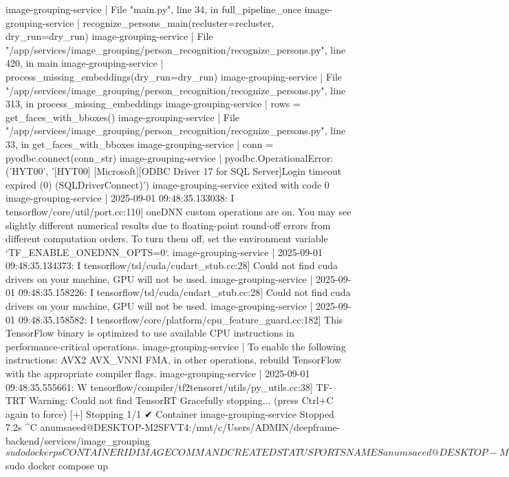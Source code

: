 image-grouping-service  |   File "main.py", line 34, in full_pipeline_once
image-grouping-service  |     recognize_persons_main(recluster=recluster, dry_run=dry_run)
image-grouping-service  |   File "/app/services/image_grouping/person_recognition/recognize_persons.py", line 420, in main
image-grouping-service  |     process_missing_embeddings(dry_run=dry_run)
image-grouping-service  |   File "/app/services/image_grouping/person_recognition/recognize_persons.py", line 313, in process_missing_embeddings
image-grouping-service  |     rows = get_faces_with_bboxes()
image-grouping-service  |   File "/app/services/image_grouping/person_recognition/recognize_persons.py", line 33, in get_faces_with_bboxes
image-grouping-service  |     conn = pyodbc.connect(conn_str)
image-grouping-service  | pyodbc.OperationalError: ('HYT00', '[HYT00] [Microsoft][ODBC Driver 17 for SQL Server]Login timeout expired (0) (SQLDriverConnect)')
image-grouping-service exited with code 0
image-grouping-service  | 2025-09-01 09:48:35.133038: I tensorflow/core/util/port.cc:110] oneDNN custom operations are on. You may see slightly different numerical results due to floating-point round-off errors from different computation orders. To turn them off, set the environment variable `TF_ENABLE_ONEDNN_OPTS=0`.
image-grouping-service  | 2025-09-01 09:48:35.134373: I tensorflow/tsl/cuda/cudart_stub.cc:28] Could not find cuda drivers on your machine, GPU will not be used.
image-grouping-service  | 2025-09-01 09:48:35.158226: I tensorflow/tsl/cuda/cudart_stub.cc:28] Could not find cuda drivers on your machine, GPU will not be used.
image-grouping-service  | 2025-09-01 09:48:35.158582: I tensorflow/core/platform/cpu_feature_guard.cc:182] This TensorFlow binary is optimized to use available CPU instructions in performance-critical operations.
image-grouping-service  | To enable the following instructions: AVX2 AVX_VNNI FMA, in other operations, rebuild TensorFlow with the appropriate compiler flags.
image-grouping-service  | 2025-09-01 09:48:35.555661: W tensorflow/compiler/tf2tensorrt/utils/py_utils.cc:38] TF-TRT Warning: Could not find TensorRT
Gracefully stopping... (press Ctrl+C again to force)
[+] Stopping 1/1
 ✔ Container image-grouping-service  Stopped                                                                                                   7.2s
^C
anumsaeed@DESKTOP-M2SFVT4:/mnt/c/Users/ADMIN/deepframe-backend/services/image_grouping$ sudo docker ps
CONTAINER ID   IMAGE     COMMAND   CREATED   STATUS    PORTS     NAMES
anumsaeed@DESKTOP-M2SFVT4:/mnt/c/Users/ADMIN/deepframe-backend/services/image_grouping$ sudo docker compose up
